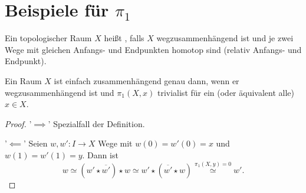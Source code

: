 \section{Beispiele für $\pi_1$}

\begin{definition}
    Ein topologischer Raum $X$ heißt  , falls $X$ wegzusammenhängend ist und je zwei Wege mit gleichen Anfangs- und Endpunkten homotop sind (relativ Anfangs- und Endpunkt).
\end{definition}

\begin{lemma}
    Ein Raum $X$ ist einfach zusammenhängend genau dann, wenn er wegzusammenhängend ist und  $\pi_1(X,x)$ trivialist für ein (oder äquivalent alle) $x\in X$.
\end{lemma}

\begin{proof}
'$\implies$' Spezialfall der Definition.    

'$\impliedby$' Seien $w, w'\colon I \to X$ Wege mit $w(0) = w'(0) =x$ und  $w(1) = w'(1) = y$. Dann ist 
 \[
     w \simeq (w' \star  \overline{w'}) \star w \simeq w' \star (\overline{w'} \star w) \stackrel{\pi_1(X,y) = 0}{\simeq} w'
.\] 
\end{proof}

